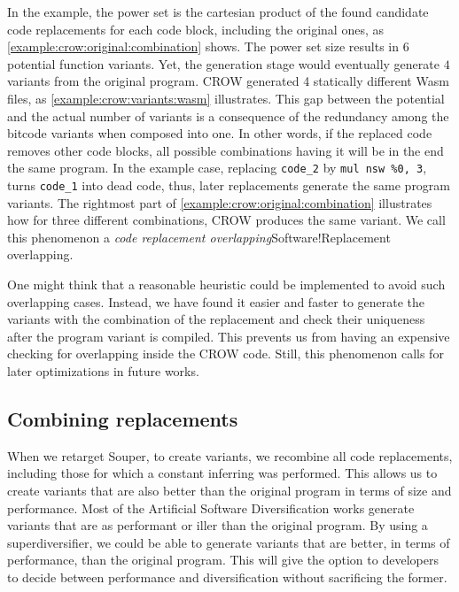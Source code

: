 In the example, the power set is the cartesian product of the found candidate code replacements for each code block, including the original ones, as \autoref{example:crow:original:combination} shows. The power set size results in $6$ potential function variants. Yet, the generation stage would eventually generate $4$ variants from the original program. CROW generated 4 statically different Wasm  files, as \autoref{example:crow:variants:wasm} illustrates. This gap between the potential and the actual number of variants is a consequence of the redundancy among the bitcode variants when composed into one. In other words, if the replaced code removes other code blocks, all possible combinations having it will be in the end the same program. In the example case, replacing \texttt{code\_2} by \texttt{mul nsw \%0, 3}, turns \texttt{code\_1} into dead code, thus, later replacements generate the same program variants. The rightmost part of \autoref{example:crow:original:combination} illustrates how for three different combinations, CROW produces the same variant. We call this phenomenon a \emph{code replacement overlapping}{Software!Replacement overlapping}.



One might think that a reasonable heuristic could be implemented to avoid such overlapping cases. Instead, we have found it easier and faster to generate the variants with the combination of the replacement and check their uniqueness after the program variant is compiled. This prevents us from having an expensive checking for overlapping inside the CROW code. Still, this phenomenon calls for later optimizations in future works.


\subsection{Combining replacements}

When we retarget Souper, to create variants, we recombine all code replacements, including those for which a constant inferring was performed.
This allows us to create variants that are also better than the original program in terms of size and performance. Most of the Artificial Software Diversification  works generate variants that are as performant or iller than the original program. By using a superdiversifier, we could be able to generate variants that are better, in terms of performance, than the original program. This will give the option to developers to decide between performance and diversification without sacrificing the former. 

